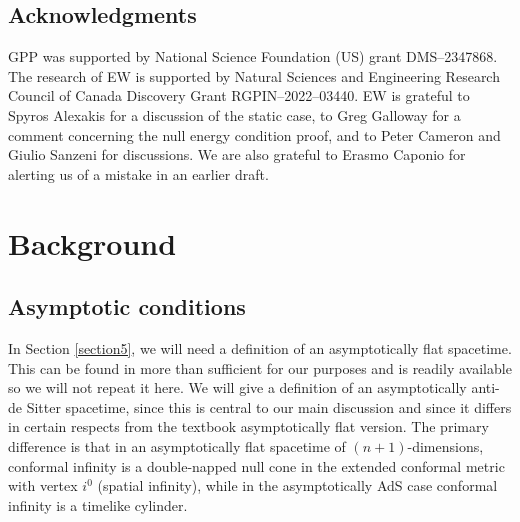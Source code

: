 \documentclass[12pt]{amsart}
\numberwithin{equation}{section}
\begin{document}
\subsection*{Acknowledgments} GPP was supported by National Science Foundation (US) grant DMS--2347868. The research of EW is supported by Natural Sciences and Engineering Research Council of Canada Discovery Grant RGPIN--2022--03440. EW is grateful to Spyros Alexakis for a discussion of the static case, to Greg Galloway for a comment concerning the null energy condition proof, and to Peter Cameron and Giulio Sanzeni for discussions. We are also grateful to Erasmo Caponio for alerting us of a mistake in an earlier draft.

\section{Background}\label{section2}
\setcounter{equation}{0}

\subsection{Asymptotic conditions}\label{subsection2.1}
In Section \ref{section5}, we will need a definition of an asymptotically flat spacetime. This can be found in \cite[p 276]{Wald} more than sufficient for our purposes and is readily available so we will not repeat it here. We will give a definition of an asymptotically anti-de Sitter spacetime, since this is central to our main discussion and since it differs in certain respects from the textbook asymptotically flat version. The primary difference is that in an asymptotically flat spacetime of $(n+1)$-dimensions, conformal infinity is a double-napped null cone in the extended conformal metric with vertex $i^0$ (spatial infinity), while in the asymptotically AdS case conformal infinity is a timelike cylinder.
\end{document}
